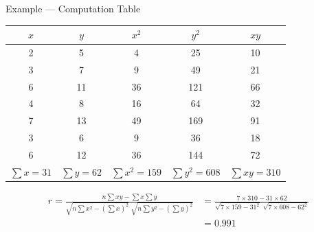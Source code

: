 \documentclass[12pt, aspectratio=169]{beamer}
\begin{document}
    \begin{frame}{Example --- Computation Table}
        \begin{center}
            \small
            \begin{tabular}{ccccc}
                \hline
                $x$ & $y$ & $x^2$ & $y^2$ & $xy$ \\
                \hline
                2 & 5  & 4  & 25  & 10 \\
                3 & 7  & 9  & 49  & 21 \\
                6 & 11 & 36 & 121 & 66 \\
                4 & 8  & 16 & 64  & 32 \\
                7 & 13 & 49 & 169 & 91 \\
                3 & 6  & 9  & 36  & 18 \\
                6 & 12 & 36 & 144 & 72 \\
                \hline
                $\sum x = 31$ & $\sum y = 62$ & $\sum x^2 = 159$ &
                $\sum y^2 = 608$ & $\sum xy = 310$ \\
                \hline
            \end{tabular}
        \end{center}

        \vspace{0.5em}

        \begin{align*}
            r = \frac{n\sum xy - \sum x\sum y}
                     {\sqrt{n\sum x^2 - \left(\sum x\right)^2}\;
                      \sqrt{n\sum y^2 - \left(\sum y\right)^2}}
              &= \frac{7 \times 310 - 31 \times 62}
                     {\sqrt{7 \times 159 - 31^2}\;\sqrt{7 \times 608 - 62^2}} \\
              &= 0.991
        \end{align*}
    \end{frame}
\end{document}
